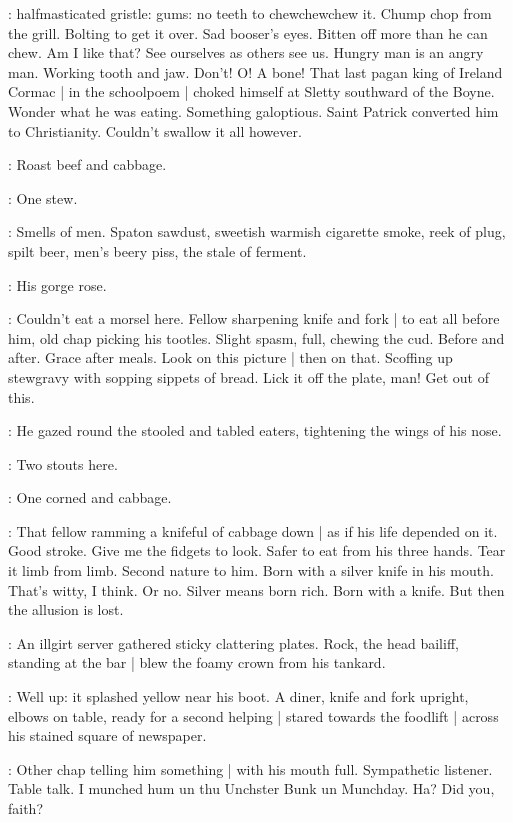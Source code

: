 \BloomInt:
halfmasticated gristle:
gums:
no teeth to chewchewchew it.
Chump chop from the grill.
Bolting to get it over.
Sad booser's eyes.
Bitten off more than he can chew.
Am I like that?
See ourselves as others see us.
Hungry man is an angry man.
Working tooth and jaw.
Don't!
O! A bone!
That last pagan king of Ireland Cormac |
in the schoolpoem |
choked himself at Sletty southward of the Boyne.
Wonder what he was eating.
Something galoptious.
Saint Patrick converted him to Christianity.
Couldn't swallow it all however.

:
Roast beef and cabbage.

:
One stew.

\BloomInt:
Smells of men.
Spaton sawdust,
sweetish warmish cigarette smoke,
reek of plug,
spilt beer,
men's beery piss,
the stale of ferment.

:
His gorge rose.

\BloomInt:
Couldn't eat a morsel here.
Fellow sharpening knife and fork |
to eat all before him,
old chap picking his tootles.
Slight spasm, full, chewing the cud.
Before and after.
Grace after meals.
Look on this picture |
then on that.
Scoffing up stewgravy with sopping sippets of bread.
Lick it off the plate, man!
Get out of this.

:
He gazed round the stooled and tabled eaters,
tightening the wings of his nose.

:
Two stouts here.

:
One corned and cabbage.

\BloomInt:
That fellow ramming a knifeful of cabbage down |
as if his life depended on it.
Good stroke.
Give me the fidgets to look.
Safer to eat from his three hands.
Tear it limb from limb.
Second nature to him.
Born with a silver knife in his mouth.
That's witty, I think.
Or no.
Silver means born rich.
Born with a knife.
But then the allusion is lost.

:
An illgirt server gathered sticky clattering plates.
Rock, the head bailiff,
standing at the bar |
blew the foamy crown from his tankard.

:
Well up:
it splashed yellow near his boot.
A diner, knife and fork upright,
elbows on table,
ready for a second helping |
stared towards the foodlift |
across his stained square of newspaper.

\BloomInt:
Other chap telling him something |
with his mouth full.
Sympathetic listener.
Table talk.
I munched hum un thu Unchster Bunk un Munchday.
Ha?
Did you, faith?

